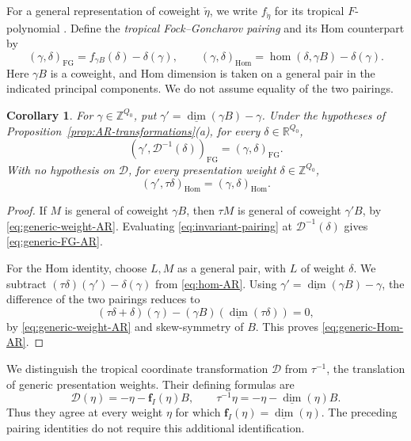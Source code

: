 \documentclass[11pt]{amsart}
\numberwithin{equation}{section}
\newtheorem{corollary}[theorem]{Corollary}
\theoremstyle{definition}
\theoremstyle{remark}
\newcommand{\ZZ}{\mathbb Z}
\newcommand{\RR}{\mathbb R}
\newcommand{\dv}{\underline{\dim}}
\begin{document}
For a general representation of coweight $\check\eta$, we write
$f_{\check\eta}$ for its tropical $F$-polynomial
\cite[Section~6.1]{FeiT23}. Define the
\emph{tropical Fock--Goncharov pairing} and its Hom counterpart by
\[ (\gamma,\delta)_{\mathrm{FG}}=f_{\gamma B}(\delta)-\delta(\gamma),\qquad (\gamma,\delta)_{\mathrm{Hom}}=\hom(\delta,\gamma B)-\delta(\gamma). \]
Here $\gamma B$ is a coweight, and Hom dimension is taken on a general
pair in the indicated principal components. We do not assume equality
of the two pairings.

\begin{corollary}\label{cor:generic-pairing-AR}
For $\gamma\in\ZZ^{Q_0}$, put $\gamma'=\dv(\gamma B)-\gamma$.
Under the hypotheses of Proposition~\ref{prop:AR-transformations}(a), for every
$\delta\in\RR^{Q_0}$,
\begin{equation}\label{eq:generic-FG-AR} (\gamma',\mathcal D^{-1}(\delta))_{\mathrm{FG}}=(\gamma,\delta)_{\mathrm{FG}}.\end{equation}
With no hypothesis on $\mathcal D$, for every presentation weight
$\delta\in\ZZ^{Q_0}$,
\begin{equation}\label{eq:generic-Hom-AR} (\gamma',\tau\delta)_{\mathrm{Hom}}=(\gamma,\delta)_{\mathrm{Hom}}.\end{equation}
\end{corollary}

\begin{proof}
If $M$ is general of coweight $\gamma B$, then $\tau M$ is general
of coweight $\gamma'B$, by \eqref{eq:generic-weight-AR}.
Evaluating \eqref{eq:invariant-pairing} at $\mathcal D^{-1}(\delta)$
gives \eqref{eq:generic-FG-AR}.

For the Hom identity, choose $L,M$ as a general pair, with $L$
of weight $\delta$. We subtract
$(\tau\delta)(\gamma')-\delta(\gamma)$ from \eqref{eq:hom-AR}.
Using $\gamma'=\dv(\gamma B)-\gamma$, the difference of the two
pairings reduces to
\[ (\tau\delta+\delta)(\gamma)-(\gamma B)(\dv(\tau\delta))=0, \]
by \eqref{eq:generic-weight-AR} and skew-symmetry of $B$.
This proves \eqref{eq:generic-Hom-AR}.
\end{proof}

We distinguish the tropical coordinate transformation $\mathcal D$ from
$\tau^{-1}$, the translation of generic presentation weights. Their
defining formulas are
\[ \mathcal D(\eta)=-\eta-\mathbf f_I(\eta)B,\qquad \tau^{-1}\eta=-\eta-\dv(\eta)B. \]
Thus they agree at every weight $\eta$ for which
$\mathbf f_I(\eta)=\dv(\eta)$. The preceding pairing identities do
not require this additional identification.
\end{document}
